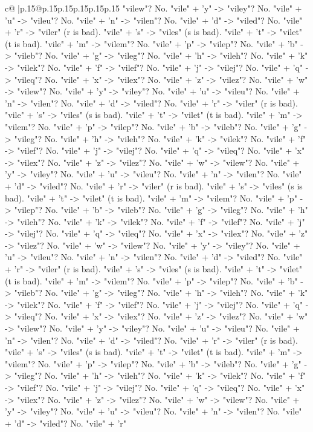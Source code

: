 \documentclass{article}
\begin{document}
{\begin{supertabular}{c@{$\;$}|p{.15\linewidth}@{}p{.15\linewidth}p{.15\linewidth}p{.15\linewidth}p{.15\linewidth}p{.15\linewidth}}
{{{"vilew"? No. "vile" + 'y" {-}> "viley"? No. "vile" + 'u" {-}> "vileu"? No. "vile" + 'n" {-}> "vilen"? No. "vile" + 'd" {-}> "viled"? No. "vile" + 'r" {-}> "viler" (r is bad). "vile" + 's" {-}> "viles" (s is bad). "vile" + 't" {-}> "vilet" (t is bad). "vile" + 'm" {-}> "vilem"? No. "vile" + 'p" {-}> "vilep"? No. "vile" + 'b" {-}> "vileb"? No. "vile" + 'g" {-}> "vileg"? No. "vile" + 'h" {-}> "vileh"? No. "vile" + 'k" {-}> "vilek"? No. "vile" + 'f" {-}> "vilef"? No. "vile" + 'j" {-}> "vilej"? No. "vile" + 'q" {-}> "vileq"? No. "vile" + 'x" {-}> "vilex"? No. "vile" + 'z" {-}> "vilez"? No. "vile" + 'w" {-}> "vilew"? No. "vile" + 'y" {-}> "viley"? No. "vile" + 'u" {-}> "vileu"? No. "vile" + 'n" {-}> "vilen"? No. "vile" + 'd" {-}> "viled"? No. "vile" + 'r" {-}> "viler" (r is bad). "vile" + 's" {-}> "viles" (s is bad). "vile" + 't" {-}> "vilet" (t is bad). "vile" + 'm" {-}> "vilem"? No. "vile" + 'p" {-}> "vilep"? No. "vile" + 'b" {-}> "vileb"? No. "vile" + 'g" {-}> "vileg"? No. "vile" + 'h" {-}> "vileh"? No. "vile" + 'k" {-}> "vilek"? No. "vile" + 'f" {-}> "vilef"? No. "vile" + 'j" {-}> "vilej"? No. "vile" + 'q" {-}> "vileq"? No. "vile" + 'x" {-}> "vilex"? No. "vile" + 'z" {-}> "vilez"? No. "vile" + 'w" {-}> "vilew"? No. "vile" + 'y" {-}> "viley"? No. "vile" + 'u" {-}> "vileu"? No. "vile" + 'n" {-}> "vilen"? No. "vile" + 'd" {-}> "viled"? No. "vile" + 'r" {-}> "viler" (r is bad). "vile" + 's" {-}> "viles" (s is bad). "vile" + 't" {-}> "vilet" (t is bad). "vile" + 'm" {-}> "vilem"? No. "vile" + 'p" {-}> "vilep"? No. "vile" + 'b" {-}> "vileb"? No. "vile" + 'g" {-}> "vileg"? No. "vile" + 'h" {-}> "vileh"? No. "vile" + 'k" {-}> "vilek"? No. "vile" + 'f" {-}> "vilef"? No. "vile" + 'j" {-}> "vilej"? No. "vile" + 'q" {-}> "vileq"? No. "vile" + 'x" {-}> "vilex"? No. "vile" + 'z" {-}> "vilez"? No. "vile" + 'w" {-}> "vilew"? No. "vile" + 'y" {-}> "viley"? No. "vile" + 'u" {-}> "vileu"? No. "vile" + 'n" {-}> "vilen"? No. "vile" + 'd" {-}> "viled"? No. "vile" + 'r" {-}> "viler" (r is bad). "vile" + 's" {-}> "viles" (s is bad). "vile" + 't" {-}> "vilet" (t is bad). "vile" + 'm" {-}> "vilem"? No. "vile" + 'p" {-}> "vilep"? No. "vile" + 'b" {-}> "vileb"? No. "vile" + 'g" {-}> "vileg"? No. "vile" + 'h" {-}> "vileh"? No. "vile" + 'k" {-}> "vilek"? No. "vile" + 'f" {-}> "vilef"? No. "vile" + 'j" {-}> "vilej"? No. "vile" + 'q" {-}> "vileq"? No. "vile" + 'x" {-}> "vilex"? No. "vile" + 'z" {-}> "vilez"? No. "vile" + 'w" {-}> "vilew"? No. "vile" + 'y" {-}> "viley"? No. "vile" + 'u" {-}> "vileu"? No. "vile" + 'n" {-}> "vilen"? No. "vile" + 'd" {-}> "viled"? No. "vile" + 'r" {-}> "viler" (r is bad). "vile" + 's" {-}> "viles" (s is bad). "vile" + 't" {-}> "vilet" (t is bad). "vile" + 'm" {-}> "vilem"? No. "vile" + 'p" {-}> "vilep"? No. "vile" + 'b" {-}> "vileb"? No. "vile" + 'g" {-}> "vileg"? No. "vile" + 'h" {-}> "vileh"? No. "vile" + 'k" {-}> "vilek"? No. "vile" + 'f" {-}> "vilef"? No. "vile" + 'j" {-}> "vilej"? No. "vile" + 'q" {-}> "vileq"? No. "vile" + 'x" {-}> "vilex"? No. "vile" + 'z" {-}> "vilez"? No. "vile" + 'w" {-}> "vilew"? No. "vile" + 'y" {-}> "viley"? No. "vile" + 'u" {-}> "vileu"? No. "vile" + 'n" {-}> "vilen"? No. "vile" + 'd" {-}> "viled"? No. "vile" + 'r" }}}
\end{supertabular}}
\end{document}
